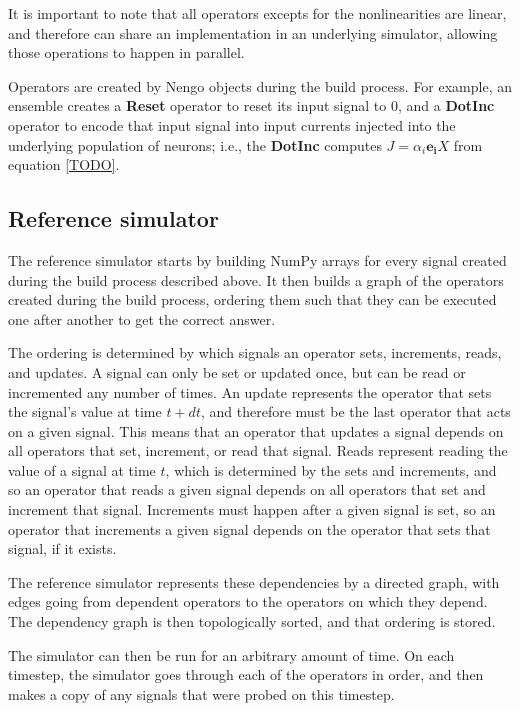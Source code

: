 \documentclass{frontiersSCNS}
\begin{document}
It is important to note that all operators
excepts for the nonlinearities are linear,
and therefore can share an implementation
in an underlying simulator,
allowing those operations to happen in parallel.

Operators are created
by Nengo objects during the build process.
For example, an ensemble creates
a \textbf{Reset} operator to reset
its input signal to 0,
and a \textbf{DotInc} operator
to encode that input signal into
input currents injected into
the underlying population of neurons;
i.e., the \textbf{DotInc} computes
$J = \alpha_i \mathbf{e_i} X$ from equation \eqref{TODO}.

\subsection{Reference simulator}

The reference simulator starts by
building NumPy arrays
for every signal created during the build process
described above.
It then builds a graph of the
operators created during the build process,
ordering them such that they can be
executed one after another to get the correct answer.

The ordering is determined
by which signals an operator
sets, increments, reads, and updates.
A signal can only be set or updated once,
but can be read or incremented any number of times.
An update represents the operator that sets
the signal's value at time $t+dt$,
and therefore must be the last operator
that acts on a given signal.
This means that an operator
that updates a signal depends on
all operators that set, increment,
or read that signal.
Reads represent reading the value
of a signal at time $t$,
which is determined by the sets
and increments, and so
an operator that reads a given signal
depends on all operators that
set and increment that signal.
Increments must happen
after a given signal is set,
so an operator that increments a given
signal depends on the operator
that sets that signal, if it exists.

The reference simulator represents
these dependencies by a directed graph,
with edges going from
dependent operators to
the operators on which they depend.
The dependency graph is then topologically sorted,
and that ordering is stored.

The simulator can then be run
for an arbitrary amount of time.
On each timestep,
the simulator goes through each of the
operators in order,
and then makes a copy of any signals
that were probed on this timestep.
\end{document}
